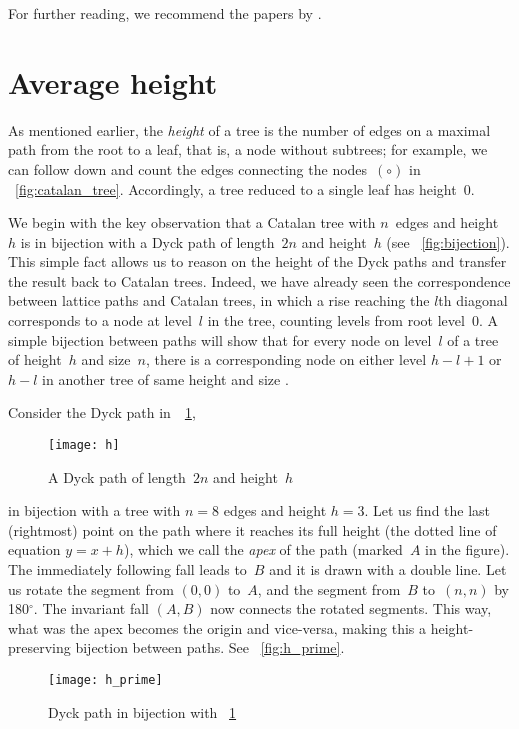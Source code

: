 For further reading, we recommend the papers by
\citet*{DershwowitzZaks_1980,DershowitzZaks_1981,DershowitzZaks_1990}.

\section{Average height}
\label{sec:Catalan_height}

As mentioned earlier, the \emph{height} of a tree is the number of
edges on a maximal path from the root to a leaf, that is, a node
without subtrees; for example, we can follow down and count the edges
connecting the nodes~\((\circ)\) in
\fig~\vref{fig:catalan_tree}. Accordingly, a tree reduced to a single
leaf has height~\(0\).

We begin with the key observation that a Catalan tree with \(n\)~edges
and height~\(h\) is in bijection with a Dyck path of length~\(2n\) and
height~\(h\) (see \fig~\vref{fig:bijection}). This simple fact allows
us to reason on the height of the Dyck paths and transfer the result
back to Catalan trees. Indeed, we have already seen the correspondence
between lattice paths and Catalan trees, in which a rise reaching the
$l$th diagonal corresponds to a node at level~$l$ in the tree,
counting levels from root level~$0$. A simple bijection between paths
will show that for every node on level~$l$ of a tree of height~$h$ and
size~$n$, there is a corresponding node on either level $h-l+1$ or
$h-l$ in another tree of same height and size
\citep{Rinderknecht_2013d}.

Consider the Dyck path in~\Fig~\ref{fig:h},
\begin{figure}
\centering
\texttt{[image: h]}
\caption{A Dyck path of length~\(2n\) and height~\(h\)}
\label{fig:h}
\end{figure}
in bijection with a tree with \(n=8\) edges and height \(h=3\). Let us
find the last (rightmost) point on the path where it reaches its full
height (the dotted line of equation \(y = x + h\)), which we call the
\emph{apex} of the path (marked~$A$ in the figure). The immediately
following fall leads to~$B$ and it is drawn with a double line. Let us
rotate the segment from $(0,0)$ to~$A$, and the segment from~$B$
to~$(n,n)$ by 180$^\circ$. The invariant fall $(A,B)$ now connects the
rotated segments. This way, what was the apex becomes the origin and
vice\hyp{}versa, making this a height\hyp{}preserving bijection
between paths. See \fig~\vref{fig:h_prime}.
\begin{figure}
\centering
\texttt{[image: h\_prime]}
\caption{Dyck path in bijection with \fig~\ref{fig:h}}
\label{fig:h_prime}
\end{figure}

